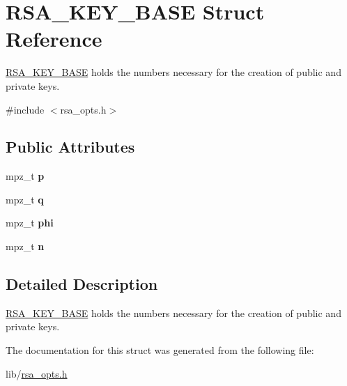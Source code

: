\hypertarget{struct_r_s_a___k_e_y___b_a_s_e}{\section{R\-S\-A\-\_\-\-K\-E\-Y\-\_\-\-B\-A\-S\-E Struct Reference}
\label{struct_r_s_a___k_e_y___b_a_s_e}
}


\hyperlink{struct_r_s_a___k_e_y___b_a_s_e}{R\-S\-A\-\_\-\-K\-E\-Y\-\_\-\-B\-A\-S\-E} holds the numbers necessary for the creation of public and private keys.  




{\ttfamily \#include $<$rsa\-\_\-opts.\-h$>$}

\subsection*{Public Attributes}
\begin{DoxyCompactItemize}
\item 
\hypertarget{struct_r_s_a___k_e_y___b_a_s_e_afba701ef249a6c94ad3c369ae05d6864}{mpz\-\_\-t {\bfseries p}}\label{struct_r_s_a___k_e_y___b_a_s_e_afba701ef249a6c94ad3c369ae05d6864}

\item 
\hypertarget{struct_r_s_a___k_e_y___b_a_s_e_a5b947a4ba3d3148ad4326bc908e57411}{mpz\-\_\-t {\bfseries q}}\label{struct_r_s_a___k_e_y___b_a_s_e_a5b947a4ba3d3148ad4326bc908e57411}

\item 
\hypertarget{struct_r_s_a___k_e_y___b_a_s_e_a25405ba9f9805c4d4608f7777ac1c258}{mpz\-\_\-t {\bfseries phi}}\label{struct_r_s_a___k_e_y___b_a_s_e_a25405ba9f9805c4d4608f7777ac1c258}

\item 
\hypertarget{struct_r_s_a___k_e_y___b_a_s_e_a8227f1b9df0e4b8a6c77d8446faf1b68}{mpz\-\_\-t {\bfseries n}}\label{struct_r_s_a___k_e_y___b_a_s_e_a8227f1b9df0e4b8a6c77d8446faf1b68}

\end{DoxyCompactItemize}


\subsection{Detailed Description}
\hyperlink{struct_r_s_a___k_e_y___b_a_s_e}{R\-S\-A\-\_\-\-K\-E\-Y\-\_\-\-B\-A\-S\-E} holds the numbers necessary for the creation of public and private keys. 

The documentation for this struct was generated from the following file\-:\begin{DoxyCompactItemize}
\item 
lib/\hyperlink{rsa__opts_8h}{rsa\-\_\-opts.\-h}\end{DoxyCompactItemize}
